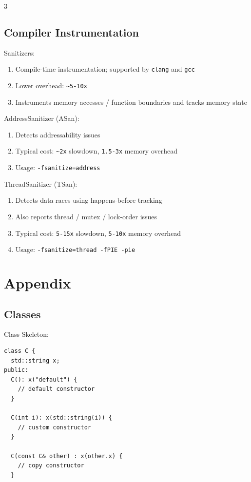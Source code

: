 \documentclass[12pt, a4paper]{article}
\begin{document}
\begin{multicols*}{3}
\subsection{Compiler Instrumentation}

Sanitizers:
\begin{enumerate}[\roman*.]
  \item Compile-time instrumentation; supported by \lstinline|clang| and \lstinline|gcc|
  \item Lower overhead: \lstinline|~5-10x|
  \item Instruments memory accesses / function boundaries and tracks memory state
\end{enumerate}

AddressSanitizer (ASan):
\begin{enumerate}[\roman*.]
  \item Detects addressability issues
  \item Typical cost: \lstinline|~2x| slowdown, \lstinline|1.5-3x| memory overhead
  \item Usage: \lstinline|-fsanitize=address|
\end{enumerate}

ThreadSanitizer (TSan):
\begin{enumerate}[\roman*.]
  \item Detects data races using happens-before tracking
  \item Also reports thread / mutex / lock-order issues
  \item Typical cost: \lstinline|5-15x| slowdown, \lstinline|5-10x| memory overhead
  \item Usage: \lstinline|-fsanitize=thread -fPIE -pie|
\end{enumerate}
\colbreak 
\colbreak

\section*{Appendix}
\lstset{style=cpp}
\subsection{Classes}

Class Skeleton:
\begin{lstlisting}
class C {
  std::string x;
public:
  C(): x("default") {
    // default constructor
  }

  C(int i): x(std::string(i)) {
    // custom constructor
  }

  C(const C& other) : x(other.x) {
    // copy constructor
  }


\end{lstlisting}
\end{multicols*}
\end{document}
